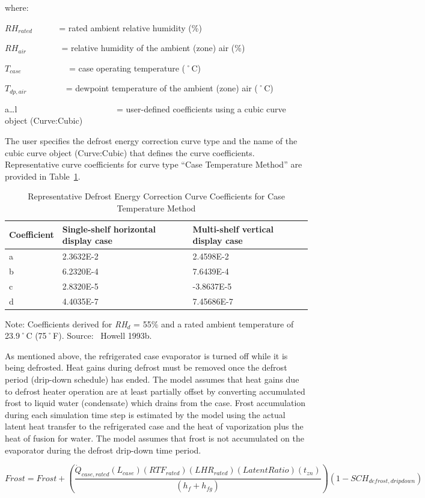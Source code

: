 where:

\(R{H_{rated}}\) ~~~~~ = rated ambient relative humidity (\%)

\(R{H_{air}}\) ~~~~~~~ = relative humidity of the ambient (zone) air (\%)

\({T_{case}}\) ~~~~~~~~~~ = case operating temperature (˚C)

\({T_{dp,air}}\) ~~~~~~~~ = dewpoint temperature of the ambient (zone) air (˚C)

a\ldots{}l~~~~~~~~~~~~~~~~~~~~~~~ = user-defined coefficients using a cubic curve object (Curve:Cubic)

The user specifies the defrost energy correction curve type and the name of the cubic curve object (Curve:Cubic) that defines the curve coefficients. Representative curve coefficients for curve type ``Case Temperature Method'' are provided in Table~\ref{table:representative-defrost-energy-correction}.

\begin{longtable}[c]{p{1.5in}p{2.36in}p{2.13in}}
\caption{Representative Defrost Energy Correction Curve Coefficients for Case Temperature Method \protect \label{table:representative-defrost-energy-correction}}\\
\toprule 
Coefficient & Single-shelf horizontal display case & Multi-shelf vertical display case \tabularnewline \midrule
\endhead
a & 2.3632E-2 & 2.4598E-2 \tabularnewline
b & 6.2320E-4 & 7.6439E-4 \tabularnewline
c & 2.8320E-5 & -3.8637E-5 \tabularnewline
d & 4.4035E-7 & 7.45686E-7 \tabularnewline
\bottomrule
\end{longtable}

Note: Coefficients derived for \emph{RH\(_{d}\)} = 55\% and a rated ambient temperature of 23.9˚C (75˚F). Source:~ Howell 1993b.

As mentioned above, the refrigerated case evaporator is turned off while it is being defrosted. Heat gains during defrost must be removed once the defrost period (drip-down schedule) has ended. The model assumes that heat gains due to defrost heater operation are at least partially offset by converting accumulated frost to liquid water (condensate) which drains from the case. Frost accumulation during each simulation time step is estimated by the model using the actual latent heat transfer to the refrigerated case and the heat of vaporization plus the heat of fusion for water. The model assumes that frost is not accumulated on the evaporator during the defrost drip-down time period.

\begin{equation}
Frost = Frost + \left( {\frac{{{{\dot Q}_{case,rated}}\left( {{L_{case}}} \right)\left( {RT{F_{rated}}} \right)\left( {LH{R_{rated}}} \right)\left( {LatentRatio} \right)\left( {{t_{zn}}} \right)}}{{\left( {{h_f} + {h_{fg}}} \right)}}} \right)\left( {1 - SC{H_{defrost,dripdown}}} \right)
\end{equation}

